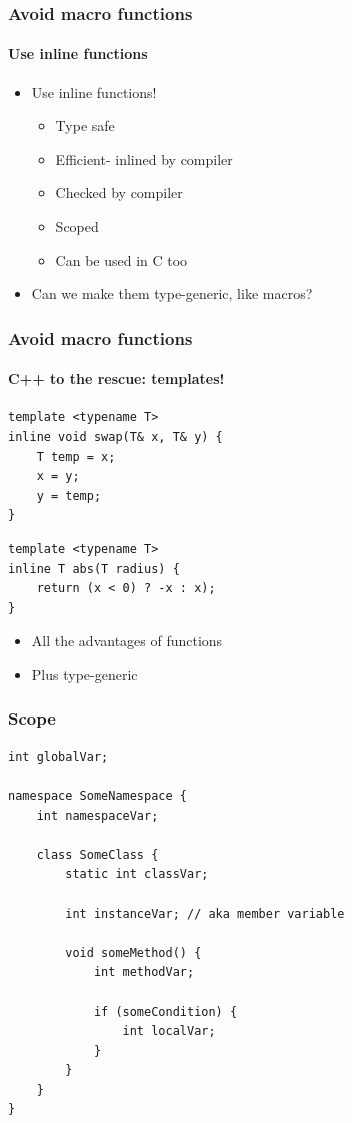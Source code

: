 \documentclass[table]{beamer}
\newcounter{rulecount}
\newcommand{\declarerule}{\textbf{\color{themeblue}{Rule \therulecount:}} }
\newcommand{\declarelesson}{\textbf{\color{themeyellow}{Lesson:}} }
\begin{document}
\begin{frame}[fragile]
    \frametitle{\declarerule Avoid macro functions}
    \framesubtitle{Use inline functions}
    \begin{itemize}
        \item<1->Use inline functions!
            \begin{itemize}
                \item Type safe
                \item Efficient- inlined by compiler
                \item Checked by compiler
                \item Scoped
                \item Can be used in C too
            \end{itemize}
        \item<2->Can we make them type-generic, like macros?
    \end{itemize}
\end{frame}

\begin{frame}[fragile]
    \frametitle{\declarerule Avoid macro functions}
    \framesubtitle{C++ to the rescue: templates!}
\begin{lstlisting}
template <typename T>
inline void swap(T& x, T& y) {
    T temp = x;
    x = y;
    y = temp;
}
\end{lstlisting}

\begin{lstlisting}
template <typename T>
inline T abs(T radius) {
    return (x < 0) ? -x : x);
}
\end{lstlisting}
\begin{itemize}
    \item All the advantages of functions
    \item Plus type-generic
\end{itemize}
\end{frame}

\begin{frame}[fragile]
    \frametitle{\declarelesson Scope}
    \begin{lstlisting}[basicstyle=\scriptsize\ttfamily\color{codefg}]
int globalVar;

namespace SomeNamespace {
    int namespaceVar;

    class SomeClass {
        static int classVar;

        int instanceVar; // aka member variable

        void someMethod() {
            int methodVar;

            if (someCondition) {
                int localVar;
            }
        }
    }
}
    \end{lstlisting}
\end{frame}
\end{document}
